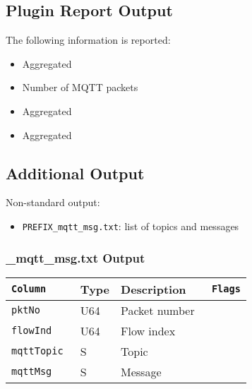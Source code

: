 \documentclass[documentation]{subfiles}
\begin{document}
\subsection{Plugin Report Output}
The following information is reported:
\begin{itemize}
    \item Aggregated {\tt{}}
    \item Number of MQTT packets
    \item Aggregated {\tt{}}
    \item Aggregated {\tt{}}
\end{itemize}

\subsection{Additional Output}
Non-standard output:
\begin{itemize}
    \item {\tt PREFIX\_mqtt\_msg.txt}: list of topics and messages
\end{itemize}

\subsubsection{\_mqtt\_msg.txt Output}
\begin{longtable}{>{\tt}lll>{\tt\small}l}
    \toprule
    {\bf Column} & {\bf Type} & {\bf Description} & {\bf Flags}\\
    \midrule\endhead%
    pktNo        & U64        & Packet number     & \\
    flowInd      & U64        & Flow index        & \\
    mqttTopic    & S          & Topic             & \\
    mqttMsg      & S          & Message           & \\
    \bottomrule
\end{longtable}
\end{document}
